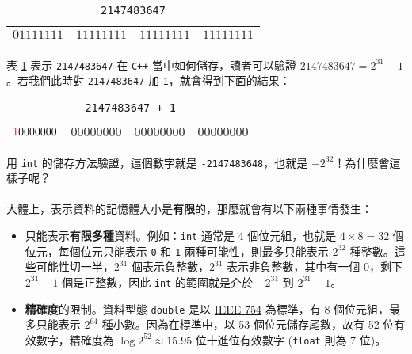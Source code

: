 \documentclass[12pt,a4paper,oneside]{article}
\begin{document}
\begin{CJK}{UTF8}{bkai}
\begin{table}[h!]
\centering
\begin{tabular}{|c|c|c|c|}
\hline
$01111111$ & $11111111$ & $11111111$ & $11111111$\\
\hline
\end{tabular}
\caption{\lstinline!2147483647!}
\label{program:struct:table:binary:2147483647}
\end{table}

\paragraph{}表 \ref{program:struct:table:binary:2147483647} 表示 \lstinline!2147483647! 在 \texttt{C++} 當中如何儲存，讀者可以驗證 $2147483647=2^{31}-1$。若我們此時對 \lstinline!2147483647! 加 \lstinline!1!，就會得到下面的結果：

\begin{table}[h!]
\centering
\begin{tabular}{|c|c|c|c|}
\hline
${\color{red}1}0000000$ & $00000000$ & $00000000$ & $00000000$\\
\hline
\end{tabular}
\caption{\lstinline!2147483647 + 1!}
\end{table}

\paragraph{}用 \lstinline!int! 的儲存方法驗證，這個數字就是 \lstinline!-2147483648!，也就是 $-2^{32}$！為什麼會這樣子呢？
\paragraph{}大體上，表示資料的記憶體大小是\textbf{有限}的，那麼就會有以下兩種事情發生：
\begin{itemize}
\item 只能表示\textbf{有限多種}資料。例如：\lstinline!int! 通常是 4 個位元組，也就是 $4\times{8}=32$ 個位元，每個位元只能表示 \lstinline!0! 和 \lstinline!1! 兩種可能性，則最多只能表示 $2^{32}$ 種整數。這些可能性切一半，$2^{31}$ 個表示負整數，$2^{31}$ 表示非負整數，其中有一個 $0$，剩下 $2^{31}-1$ 個是正整數，因此 \lstinline!int! 的範圍就是介於 $-2^{31}$ 到 $2^{31}-1$。
\item \textbf{精確度}的限制。資料型態 \lstinline!double! 是以 \href{https://zh.wikipedia.org/wiki/IEEE_754}{IEEE 754} 為標準，有 8 個位元組，最多只能表示 $2^64$ 種小數。因為在標準中，以 53 個位元儲存尾數，故有 52 位有效數字，精確度為 $\log{2^{52}}\approx{15.95}$ 位十進位有效數字 (\lstinline!float! 則為 7 位)。
\end{itemize}


\end{CJK}
\end{document}
